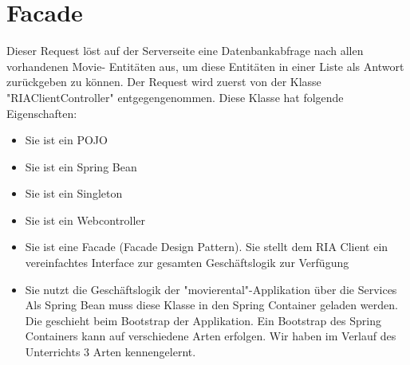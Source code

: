 \documentclass[a4paper,10pt]{scrreprt}
\begin{document}
\section{Facade}
Dieser Request löst auf der Serverseite eine Datenbankabfrage nach allen vorhandenen Movie-
Entitäten aus, um diese Entitäten in einer Liste als Antwort zurückgeben zu können.
Der Request wird zuerst von der Klasse "RIAClientController" entgegengenommen. Diese Klasse
hat folgende Eigenschaften:
\begin{itemize}
\item Sie ist ein POJO
\item Sie ist ein Spring Bean
\item Sie ist ein Singleton
\item Sie ist ein Webcontroller
\item Sie ist eine Facade (Facade Design Pattern). Sie stellt dem RIA Client ein vereinfachtes
Interface zur gesamten Geschäftslogik zur Verfügung
\item Sie nutzt die Geschäftslogik der "movierental"-Applikation über die Services
Als Spring Bean muss diese Klasse in den Spring Container geladen werden. Die geschieht beim
Bootstrap der Applikation. Ein Bootstrap des Spring Containers kann auf verschiedene Arten
erfolgen. Wir haben im Verlauf des Unterrichts 3 Arten kennengelernt.
\end{itemize}
\end{document}
